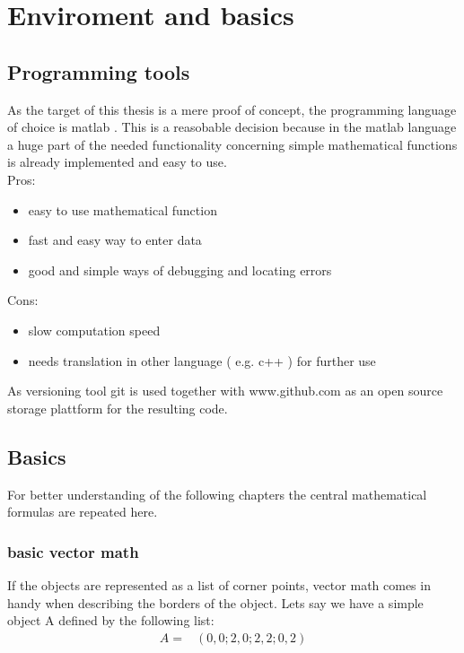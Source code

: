 \chapter{Enviroment and basics}
\label{cha:enviromentandbasics}

\section{Programming tools}
As the target of this thesis is a mere proof of concept, the programming language of choice is matlab \cite{tool:matlab}. This is a reasobable decision because in the matlab language a huge part of the needed functionality concerning simple mathematical functions is already implemented and easy to use. \\
Pros:
\begin{itemize}
\item easy to use mathematical function
\item fast and easy way to enter data
\item good and simple ways of debugging and locating errors 
\end{itemize}
Cons:
\begin{itemize}
\item slow computation speed
\item needs translation in other language ( e.g. c++ ) for further use
\end{itemize}

As versioning tool git \cite{tool:git} is used together with www.github.com as an open source storage plattform for the resulting code.

\section{Basics}
For better understanding of the following chapters the central mathematical formulas are repeated here.

\subsection{basic vector math} %
If the objects are represented as a list of corner points, vector math comes in handy when describing the borders of the object.
Lets say we have a simple object A defined by the following list:
\begin{align*}
A = 	&( 0 , 0 ;2 , 0 ;2, 2; 0, 2)	
\end{align*}


